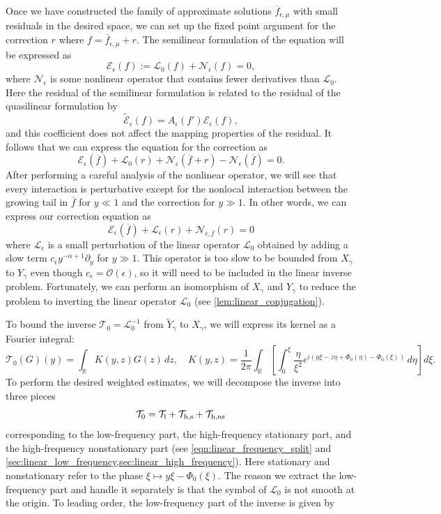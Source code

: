 \documentclass[11pt]{amsart}
\theoremstyle{definition}
\theoremstyle{remark}
\numberwithin{equation}{section}
\newcommand{\sq}[1]{\widetilde{#1}}
\newcommand{\R}{\mathbb{R}}
\newcommand{\mc}[1]{\mathcal{#1}}
\newcommand{\ov}[1]{\overline{#1}}
\begin{document}
Once we have constructed the family of approximate solutions $\ov{f}_{\epsilon, \mu}$ with small residuals in the desired space, we can set up the fixed point argument for the correction $r$ where $f = \ov{f}_{\epsilon, \mu} + r$. The semilinear formulation of the equation will be expressed as
\[\mc{E}_\epsilon(f) := \mc{L}_0(f) + \mc{N}_\epsilon(f) = 0,\]
where $\mc{N}_\epsilon$ is some nonlinear operator that contains fewer derivatives than $\mc{L}_0$. Here the residual of the semilinear formulation is related to the residual of the quasilinear formulation by
\[\sq{\mc{E}}_\epsilon(f) = A_\epsilon(f')\mc{E}_\epsilon(f),\]
and this coefficient does not affect the mapping properties of the residual. It follows that we can express the equation for the correction as
\[\mc{E}_\epsilon(\ov{f}) + \mc{L}_0(r) + \mc{N}_{\epsilon}(\ov{f} + r) - \mc{N}_\epsilon(\ov{f}) = 0.\]
After performing a careful analysis of the nonlinear operator, we will see that every interaction is perturbative except for the nonlocal interaction between the growing tail in $\ov{f}$ for $y \ll 1$ and the correction for $y \gg 1$. In other words, we can express our correction equation as
\[\mc{E}_\epsilon(\ov{f}) + \mc{L}_\epsilon(r) + \mc{N}_{\epsilon, \ov{f}}(r) = 0\]
where $\mc{L}_\epsilon$ is a small perturbation of the linear operator $\mc{L}_0$ obtained by adding a slow term $c_\epsilon y^{-\alpha + 1}\partial_y$ for $y \gg 1$. This operator is too slow to be bounded from $X_\gamma$ to $Y_\gamma$ even though $c_\epsilon = \mc{O}(\epsilon)$, so it will need to be included in the linear inverse problem. Fortunately, we can perform an isomorphism of $X_\gamma$ and $Y_\gamma$ to reduce the problem to inverting the linear operator $\mc{L}_0$ (see \cref{lem:linear_conjugation}). \par
To bound the inverse $\mc{T}_0 = \mc{L}_0^{-1}$ from $\sq{Y}_\gamma$ to $X_\gamma$, we will express its kernel as a Fourier integral: 
\[\mc{T}_0(G)(y) = \int_{\R}K(y,z)G(z)\,dz, \quad K(y,z) = \frac{1}{2\pi}\int_{\R}\left[\int_0^\xi\frac{\eta}{\xi^2}e^{i(y\xi-z\eta+\Phi_0(\eta)-\Phi_0(\xi))}\,d\eta\right]d\xi.\]
To perform the desired weighted estimates, we will decompose the inverse into three pieces
\[\mc{T}_0 = \mc{T}_{\textup{l}} + \mc{T}_{\textup{h}, \textup{s}} + \mc{T}_{\textup{h}, \textup{ns}}\]
corresponding to the low-frequency part, the high-frequency stationary part, and the high-frequency nonstationary part (see \eqref{eqn:linear_frequency_split} and \cref{sec:linear_low_frequency,sec:linear_high_frequency}). Here stationary and nonstationary refer to the phase $\xi \mapsto y\xi - \Phi_0(\xi)$. The reason we extract the low-frequency part and handle it separately is that the symbol of $\mc{L}_0$ is not smooth at the origin. To leading order, the low-frequency part of the inverse is given by 
\end{document}

